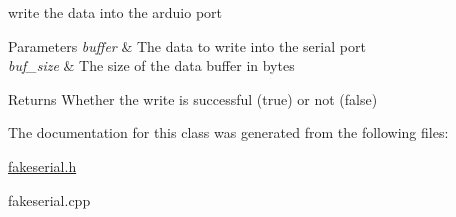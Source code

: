 write the data into the arduio port 


\begin{DoxyParams}{Parameters}
{\em buffer} & The data to write into the serial port \\
\hline
{\em buf\+\_\+size} & The size of the data buffer in bytes \\
\hline
\end{DoxyParams}
\begin{DoxyReturn}{Returns}
Whether the write is successful (true) or not (false) 
\end{DoxyReturn}


The documentation for this class was generated from the following files\+:\begin{DoxyCompactItemize}
\item 
\mbox{\hyperlink{fakeserial_8h}{fakeserial.\+h}}\item 
fakeserial.\+cpp\end{DoxyCompactItemize}
